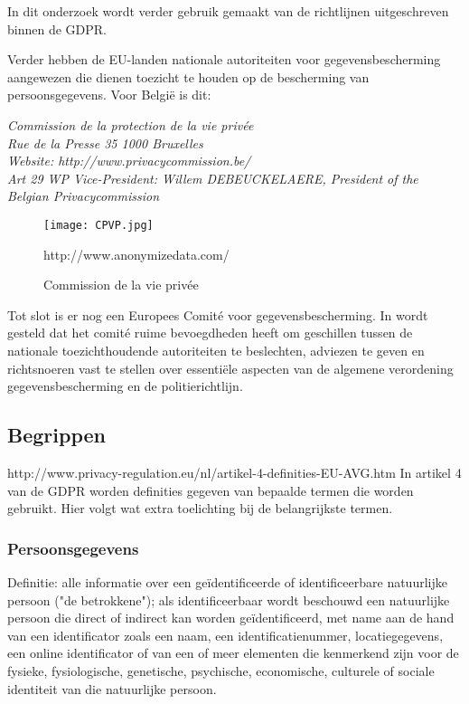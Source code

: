 In dit onderzoek wordt verder gebruik gemaakt van de richtlijnen uitgeschreven binnen de GDPR. 

Verder hebben de EU-landen nationale autoriteiten voor gegevensbescherming aangewezen die dienen toezicht te houden op de bescherming van persoonsgegevens. Voor België is dit: 

\textit{Commission de la protection de la vie privée \\  Rue de la Presse 35 1000 Bruxelles \\  Website: http://www.privacycommission.be/ \\ 
    Art 29 WP Vice-President: Willem DEBEUCKELAERE, President of the Belgian Privacycommission} 

\begin{figure}[h]
    \texttt{[image: CPVP.jpg]}
    \caption{Commission de la vie privée}
    http://www.anonymizedata.com/
\end{figure}


Tot slot is er nog een Europees Comité voor gegevensbescherming. In \textcite{Eucom2018} wordt gesteld dat het comité ruime bevoegdheden heeft om geschillen tussen de nationale toezichthoudende autoriteiten te beslechten, adviezen te geven en richtsnoeren vast te stellen over essentiële aspecten van de algemene verordening gegevensbescherming en de politierichtlijn.

\subsection{{Begrippen}}
http://www.privacy-regulation.eu/nl/artikel-4-definities-EU-AVG.htm
In artikel 4 van de GDPR worden definities gegeven van bepaalde termen die worden gebruikt. Hier volgt wat extra toelichting bij de belangrijkste termen. 

\subsubsection{Persoonsgegevens} 
Definitie: alle informatie over een geïdentificeerde of identificeerbare natuurlijke persoon ("de betrokkene"); als identificeerbaar wordt beschouwd een natuurlijke persoon die direct of indirect kan worden geïdentificeerd, met name aan de hand van een identificator zoals een naam, een identificatienummer, locatiegegevens, een online identificator of van een of meer elementen die kenmerkend zijn voor de fysieke, fysiologische, genetische, psychische, economische, culturele of sociale identiteit van die natuurlijke persoon.

